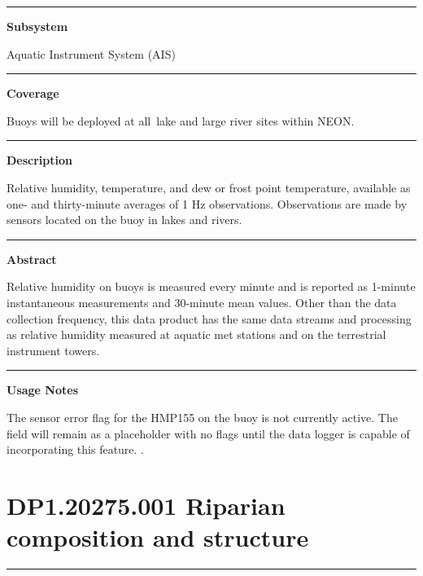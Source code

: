 \documentclass[]{article}
\begin{document}
\begin{center}\rule{0.5\linewidth}{\linethickness}\end{center}

\textbf{Subsystem}

Aquatic Instrument System (AIS)

\begin{center}\rule{0.5\linewidth}{\linethickness}\end{center}

\textbf{Coverage}

Buoys will be deployed at all~lake and large river sites within NEON.

\begin{center}\rule{0.5\linewidth}{\linethickness}\end{center}

\textbf{Description}

Relative humidity, temperature, and dew or frost point temperature,
available as one- and thirty-minute averages of 1 Hz observations.
Observations are made by sensors located on the buoy in lakes and
rivers.

\begin{center}\rule{0.5\linewidth}{\linethickness}\end{center}

\textbf{Abstract}

Relative humidity on buoys is measured every minute and is reported as
1-minute instantaneous measurements and 30-minute mean values. Other
than the data collection frequency, this data product has the same data
streams and processing as relative humidity measured at aquatic met
stations and on the terrestrial instrument towers.

\begin{center}\rule{0.5\linewidth}{\linethickness}\end{center}

\textbf{Usage Notes}

The sensor error flag for the HMP155 on the buoy is not currently
active. The field will remain as a placeholder with no flags until the
data logger is capable of incorporating this feature. \newpage
.

\section{DP1.20275.001 Riparian composition and
structure}\label{dp1.20275.001-riparian-composition-and-structure}

\begin{center}\rule{0.5\linewidth}{\linethickness}\end{center}
\end{document}
